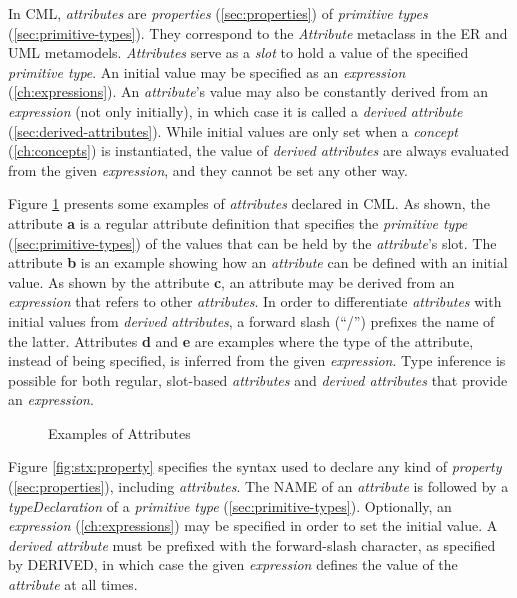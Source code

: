 \begin{definition}
In CML, \emph{attributes} are \emph{properties} (\ref{sec:properties})
of \emph{primitive types} (\ref{sec:primitive-types}).
They correspond to the \emph{Attribute} metaclass 
in the ER \cite{er} and UML \cite{uml} metamodels.
\emph{Attributes} serve as a \emph{slot} to hold a value of 
the specified \emph{primitive type}.
An initial value may be specified as an \emph{expression} (\ref{ch:expressions}).
An \emph{attribute}'s value may also be constantly
derived from an \emph{expression} (not only initially),
in which case it is called a \emph{derived attribute} (\ref{sec:derived-attributes}).
While initial values are only set when a \emph{concept} (\ref{ch:concepts})
is instantiated,
the value of \emph{derived attributes} are always evaluated 
from the given \emph{expression},
and they cannot be set any other way.
\end{definition}

\begin{examples}
Figure \ref{fig:ex:attributes} presents some examples of \emph{attributes} declared in CML.
As shown,
the attribute \textbf{a} is a regular attribute definition 
that specifies the \emph{primitive type} (\ref{sec:primitive-types})
of the values that can be held by the \emph{attribute}'s slot.
The attribute \textbf{b} is an example showing how an \emph{attribute}
can be defined with an initial value.
As shown by the attribute \textbf{c}, 
an attribute may be derived from an \emph{expression}
that refers to other \emph{attributes}.
In order to differentiate \emph{attributes} with initial values
from \emph{derived attributes},
a forward slash (``/'') prefixes the name of the latter.
Attributes \textbf{d} and \textbf{e} are examples
where the type of the attribute,
instead of being specified,
is inferred from the given \emph{expression}.
Type inference is possible for both regular, slot-based \emph{attributes}
and \emph{derived attributes} that provide an \emph{expression}.
\end{examples}

\begin{figure}
\verbatimfont{\small}

\caption{Examples of Attributes}
\label{fig:ex:attributes}
\end{figure}

\begin{concrete-syntax}
Figure \ref{fig:stx:property} specifies the syntax used
to declare any kind of \emph{property} (\ref{sec:properties}),
including \emph{attributes}.
The NAME of an \emph{attribute} is followed
by a \emph{typeDeclaration} of a \emph{primitive type}
(\ref{sec:primitive-types}).
Optionally, an \emph{expression} (\ref{ch:expressions}) may be specified
in order to set the initial value.
A \emph{derived attribute} must be prefixed with the forward-slash character,
as specified by DERIVED,
in which case the given \emph{expression} defines the value
of the \emph{attribute} at all times.
\end{concrete-syntax}

